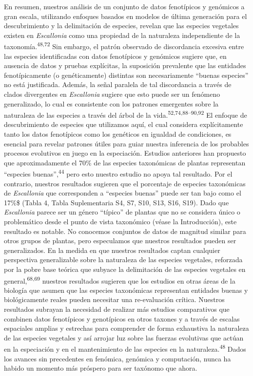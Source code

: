 \documentclass[
  11pt,
]{article}
\begin{document}
En resumen, nuestros análisis de un conjunto de datos fenotípicos y genómicos a gran escala, utilizando enfoques basados en modelos de última generación para el descubrimiento y la delimitación de especies, revelan que las especies vegetales existen en \emph{Escallonia} como una propiedad de la naturaleza independiente de la taxonomía.\textsuperscript{48,72} Sin embargo, el patrón observado de discordancia excesiva entre las especies identificadas con datos fenotípicos y genómicos sugiere que, en ausencia de datos y pruebas explícitas, la suposición prevalente que las entidades fenotípicamente (o genéticamente) distintas son necesariamente ``buenas especies'' no está justificada. Además, la señal paralela de tal discordancia a través de clados divergentes en \emph{Escallonia} sugiere que esto puede ser un fenómeno generalizado, lo cual es consistente con los patrones emergentes sobre la naturaleza de las especies a través del árbol de la vida.\textsuperscript{52,74,88--90,92} El enfoque de descubrimiento de especies que utilizamos aquí, el cual considera explícitamente tanto los datos fenotípicos como los genéticos en igualdad de condiciones, es esencial para revelar patrones útiles para guiar nuestra inferencia de los probables procesos evolutivos en juego en la especiación. Estudios anteriores han propuesto que aproximadamente el 70\% de las especies taxonómicas de plantas representan ``especies buenas'',\textsuperscript{44} pero esto nuestro estudio no apoya tal resultado. Por el contrario, nuestros resultados sugieren que el porcentaje de especies taxonómicas de \emph{Escallonia} que corresponden a ``especies buenas'' puede ser tan bajo como el 17\%\$ (Tabla 4, Tabla Suplementaria S4, S7, S10, S13, S16, S19). Dado que \emph{Escallonia} parece ser un género ``típico'' de plantas que no se considera único o problemático desde el punto de vista taxonómico (véase la Introducción), este resultado es notable. No conocemos conjuntos de datos de magnitud similar para otros grupos de plantas, pero especulamos que nuestros resultados pueden ser generalizados. En la medida en que nuestros resultados captan cualquier perspectiva generalizable sobre la naturaleza de las especies vegetales, reforzada por la pobre base teórica que subyace la delimitación de las especies vegetales en general,\textsuperscript{68,69} nuestros resultados sugieren que los estudios en otras áreas de la biología que asumen que las especies taxonómicas representan entidades buenas y biológicamente reales pueden necesitar una re-evaluación crítica. Nuestros resultados subrayan la necesidad de realizar más estudios comparativos que combinen datos fenotípicos y genotípicos en otros taxones y a través de escalas espaciales amplias y estrechas para comprender de forma exhaustiva la naturaleza de las especies vegetales y así arrojar luz sobre las fuerzas evolutivas que actúan en la especiación y en el mantenimiento de las especies en la naturaleza.\textsuperscript{48} Dados los avances sin precedentes en fenómica, genómica y computación, nunca ha habido un momento más próspero para ser taxónomo que ahora.
\end{document}
